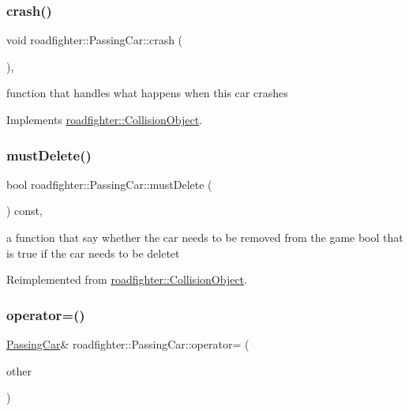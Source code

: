 \subsubsection{\texorpdfstring{crash()}{crash()}}
{\footnotesize\ttfamily void roadfighter\+::\+Passing\+Car\+::crash (\begin{DoxyParamCaption}{ }\end{DoxyParamCaption})\hspace{0.3cm}{\ttfamily [override]}, {\ttfamily [virtual]}}

function that handles what happens when this car crashes 

Implements \hyperlink{classroadfighter_1_1CollisionObject_a18f0f60a5a664d6fb554daac0d398a2c}{roadfighter\+::\+Collision\+Object}.

\mbox{\label{classroadfighter_1_1PassingCar_a96b365c19d4e6e940d3827319434a022}} 
\subsubsection{\texorpdfstring{must\+Delete()}{mustDelete()}}
{\footnotesize\ttfamily bool roadfighter\+::\+Passing\+Car\+::must\+Delete (\begin{DoxyParamCaption}{ }\end{DoxyParamCaption}) const\hspace{0.3cm}{\ttfamily [override]}, {\ttfamily [virtual]}}

a function that say whether the car needs to be removed from the game  bool that is true if the car needs to be deletet 

Reimplemented from \hyperlink{classroadfighter_1_1CollisionObject_a738071cd7b1b8cd4c8d455b5e552bd4c}{roadfighter\+::\+Collision\+Object}.

\mbox{\label{classroadfighter_1_1PassingCar_aa3cbe5aa96205e8b7f4ba99531e47735}} 
\subsubsection{\texorpdfstring{operator=()}{operator=()}\hspace{0.1cm}{\footnotesize\ttfamily [1/2]}}
{\footnotesize\ttfamily \hyperlink{classroadfighter_1_1PassingCar}{Passing\+Car}\& roadfighter\+::\+Passing\+Car\+::operator= (\begin{DoxyParamCaption}\item[{const \hyperlink{classroadfighter_1_1PassingCar}{Passing\+Car} \&}]{other }\end{DoxyParamCaption})\hspace{0.3cm}{\ttfamily [default]}}

